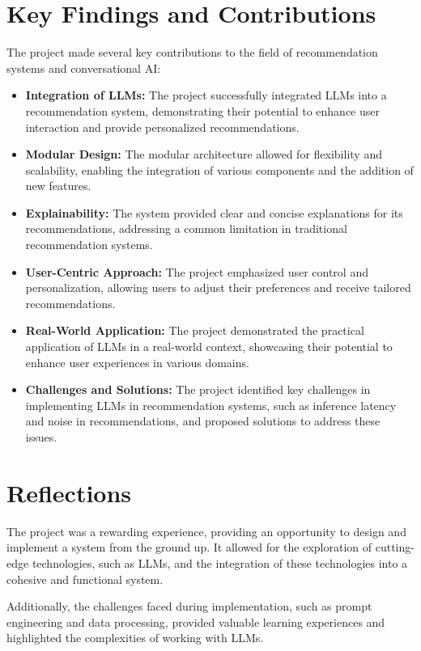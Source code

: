 \section{Key Findings and Contributions}
\label{sec:key_findings}
The project made several key contributions to the field of recommendation systems and conversational AI:
\begin{itemize}
    \item \textbf{Integration of LLMs:} The project successfully integrated LLMs into a recommendation system, demonstrating their potential to enhance user interaction and provide personalized recommendations.
    \item \textbf{Modular Design:} The modular architecture allowed for flexibility and scalability, enabling the integration of various components and the addition of new features.
    \item \textbf{Explainability:} The system provided clear and concise explanations for its recommendations, addressing a common limitation in traditional recommendation systems.
    \item \textbf{User-Centric Approach:} The project emphasized user control and personalization, allowing users to adjust their preferences and receive tailored recommendations.
    \item \textbf{Real-World Application:} The project demonstrated the practical application of LLMs in a real-world context, showcasing their potential to enhance user experiences in various domains.
    \item \textbf{Challenges and Solutions:} The project identified key challenges in implementing LLMs in recommendation systems, such as inference latency and noise in recommendations, and proposed solutions to address these issues.
\end{itemize}

\section{Reflections}
\label{sec:reflections}
The project was a rewarding experience, providing an opportunity to design and implement a system from the ground up. It allowed for the exploration of cutting-edge technologies, such as LLMs, and the integration of these technologies into a cohesive and functional system.

Additionally, the challenges faced during implementation, such as prompt engineering and data processing, provided valuable learning experiences and highlighted the complexities of working with LLMs.

